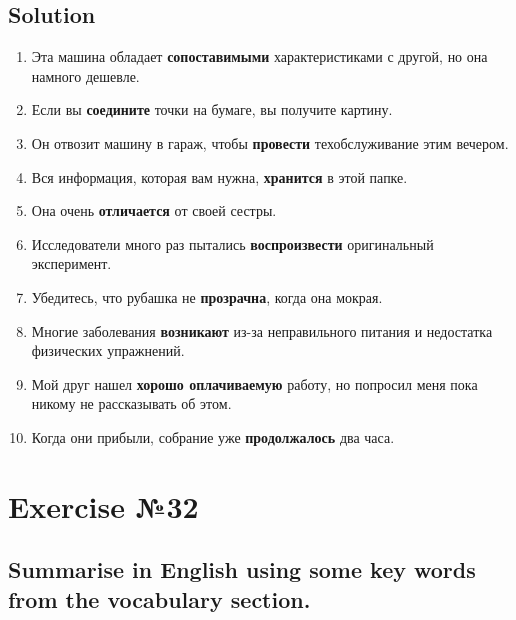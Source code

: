 \subsection*{Solution}
\begin{enumerate}
      \item Эта машина обладает \textbf{сопоставимыми} характеристиками с другой, но она намного дешевле.
      \item Если вы \textbf{соедините} точки на бумаге, вы получите картину.
      \item Он отвозит машину в гараж, чтобы \textbf{провести} техобслуживание этим вечером.
      \item Вся информация, которая вам нужна, \textbf{хранится} в этой папке.
      \item Она очень \textbf{отличается} от своей сестры.
      \item Исследователи много раз пытались \textbf{воспроизвести} оригинальный эксперимент.
      \item Убедитесь, что рубашка не \textbf{прозрачна}, когда она мокрая.
      \item Многие заболевания \textbf{возникают} из-за неправильного питания и недостатка физических упражнений.
      \item Мой друг нашел \textbf{хорошо оплачиваемую} работу, но попросил меня пока никому не рассказывать об этом.
      \item Когда они прибыли, собрание уже \textbf{продолжалось} два часа.
\end{enumerate}

\section{Exercise №32}
\subsection*{Summarise in English using some key words from the vocabulary section.}

